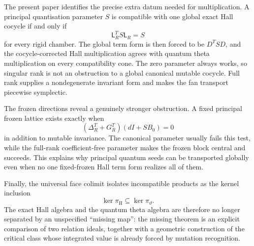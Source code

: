 The present paper identifies the precise extra datum needed for
multiplication.  A principal quantisation parameter $S$ is compatible with
one global exact Hall cocycle if and only if
\[
 \mathsf L_R^TS\mathsf L_R=S
\]
for every rigid chamber.  The global term form is then forced to be
$D^TSD$, and the cocycle-corrected Hall multiplication agrees with quantum
theta multiplication on every compatibility cone.  The zero parameter always
works, so singular rank is not an obstruction to a global canonical mutable
cocycle.  Full rank supplies a nondegenerate invariant form and makes the
fan transport piecewise symplectic.

The frozen directions reveal a genuinely stronger obstruction.  A fixed
principal frozen lattice exists exactly when
\[
 (\Delta_R^T+G_R^T)(dI+SB_0)=0
\]
in addition to mutable invariance.  The canonical parameter usually fails
this test, while the full-rank coefficient-free parameter makes the frozen
block central and succeeds.  This explains why principal quantum seeds can be
transported globally even when no one fixed-frozen Hall term form realizes all
of them.

Finally, the universal face colimit isolates incompatible products as the
kernel inclusion
\[
 \ker\pi_{\mathrm H}\subseteq\ker\pi_\vartheta.
\]
The exact Hall algebra and the quantum theta algebra are therefore no longer
separated by an unspecified ``missing map'': the missing theorem is an
explicit comparison of two relation ideals, together with a geometric
construction of the critical class whose integrated value is already forced
by mutation recognition.

